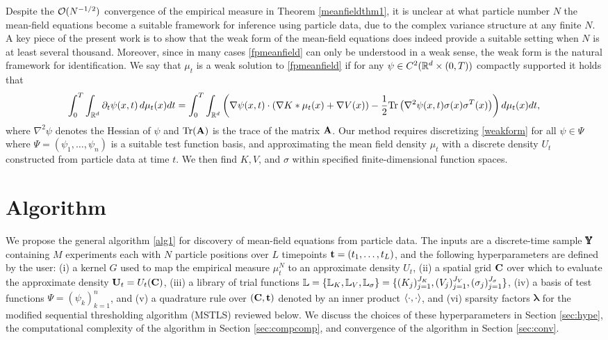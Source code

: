 \documentclass[english,reqno]{amsart}
\begin{document}
Despite the ${\mathcal{O}}(N^{-1/2})$ convergence of the empirical measure in Theorem \ref{meanfieldthm1}, it is unclear at what particle number $N$ the mean-field equations become a suitable framework for inference using particle data, due to the complex variance structure at any finite $N$. A key piece of the present work is to show that the weak form of the mean-field equations does indeed provide a suitable setting when $N$ is at least several thousand. Moreover, since in many cases \eqref{fpmeanfield} can only be understood in a weak sense, the weak form is the natural framework for identification. We say that $\mu_t$ is a weak solution to \eqref{fpmeanfield} if for any $\psi\in C^2(\mathbb{R}^d\times(0,T))$ compactly supported it holds that 
{\small
\begin{equation}\label{weakform}
\int_0^T\int_{\mathbb{R}^d} \partial_t\psi(x,t)\,d\mu_t(x)dt= \int_0^T\int_{\mathbb{R}^d} \left(\nabla\psi(x,t)\cdot\left(\nabla K*\mu_t(x)+\nabla V(x)\right) - \frac{1}{2}\text{Tr}\left(\nabla^2\psi(x,t)\sigma(x)\sigma^T(x)\right)\right)d\mu_t(x)dt,
\end{equation}}
where $\nabla^2\psi$ denotes the Hessian of $\psi$ and $\text{Tr}(\mathbf{A})$ is the trace of the matrix $\mathbf{A}$. Our method requires discretizing \eqref{weakform} for all $\psi\in \Psi$ where $\Psi = (\psi_1,\dots,\psi_n)$ is a suitable test function basis, and approximating the mean field density $\mu_t$ with a discrete density $U_t$ constructed from particle data at time $t$. We then find $K, V$, and $\sigma$ within specified finite-dimensional function spaces. 

\section{Algorithm}\label{sec:algorithm}

We propose the general algorithm \ref{alg1} for discovery of mean-field equations from particle data. The inputs are a discrete-time sample $\pmb{\mathbb{Y}}$ containing $M$ experiments each with $N$ particle positions over $L$ timepoints $\mathbf{t}=(t_1,\dots,t_L)$, and the following hyperparameters are defined by the user: (i) a kernel $G$ used to map the empirical measure $\mu^N_t$ to an approximate density $U_t$, (ii) a spatial grid $\mathbf{C}$ over which to evaluate the approximate density $\mathbf{U}_t=U_t(\mathbf{C})$,  (iii) a library of trial functions $\mathbb{L} = \{\mathbb{L}_K,\mathbb{L}_V,\mathbb{L}_\sigma\}=\{(K_j)_{j=1}^{J_K},(V_j)_{j=1}^{J_V},(\sigma_j)_{j=1}^{J_\sigma}\}$, (iv) a basis of test functions $\Psi=(\psi_k)_{k=1}^n$, and (v) a quadrature rule over $(\mathbf{C},\mathbf{t})$ denoted by an inner product $\left\langle\cdot,\cdot\right\rangle$, and (vi) sparsity factors $\pmb{\lambda}$ for the modified sequential thresholding algorithm (MSTLS) reviewed below. We discuss the choices of these hyperparameters in Section \ref{sec:hype}, the computational complexity of the algorithm in Section \ref{sec:compcomp}, and convergence of the algorithm in Section \ref{sec:conv}.
\end{document}
